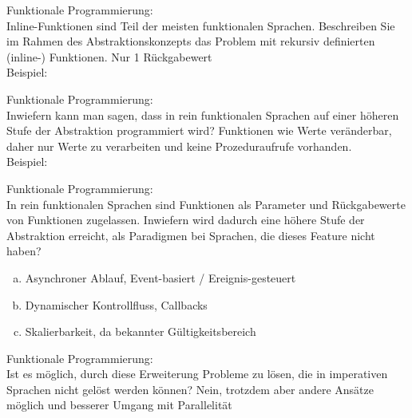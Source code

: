\begin{card}
	Funktionale Programmierung:\\
	Inline-Funktionen sind Teil der meisten funktionalen Sprachen. Beschreiben Sie im Rahmen des Abstraktionskonzepts das Problem mit rekursiv definierten (inline-) Funktionen.
	\hr
	Nur 1 Rückgabewert\\
	Beispiel:
\end{card}

\begin{card}
	Funktionale Programmierung:\\
	Inwiefern kann man sagen, dass in rein funktionalen Sprachen auf einer höheren Stufe der Abstraktion programmiert wird?
	\hr
	Funktionen wie Werte veränderbar, daher nur Werte zu verarbeiten und keine Prozeduraufrufe vorhanden.\\
	Beispiel: 
\end{card}

\begin{card}
	Funktionale Programmierung:\\
	In rein funktionalen Sprachen sind Funktionen als Parameter und Rückgabewerte von Funktionen zugelassen. Inwiefern wird dadurch eine höhere Stufe der Abstraktion erreicht, als Paradigmen bei Sprachen, die dieses Feature nicht haben?
	\hr
	\begin{enumerate}[a)]
	\item Asynchroner Ablauf, Event-basiert / Ereignis-gesteuert
	\item Dynamischer Kontrollfluss, Callbacks
	\item Skalierbarkeit, da bekannter Gültigkeitsbereich
	\end{enumerate}
\end{card}

\begin{card}
	Funktionale Programmierung:\\
	Ist es möglich, durch diese Erweiterung Probleme zu lösen, die in imperativen Sprachen nicht gelöst werden können?
	\hr
	Nein, trotzdem aber andere Ansätze möglich und besserer Umgang mit Parallelität
\end{card}